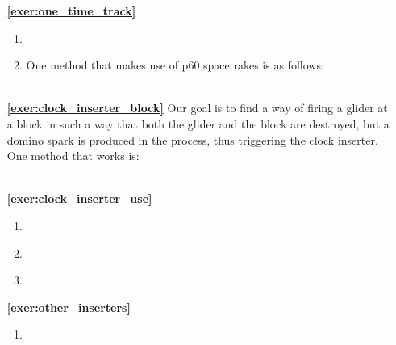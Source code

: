 \begin{multicols}{2}
\begin{itemize}[leftmargin=0em]
	
	\item[\bf\color{ocre}\sffamily\ref{exer:one_time_track}]
	\begin{enumerate}[leftmargin=1.5em,label=\bf\color{ocre}(\alph*)]
		\item {} \\
		
		\item One method that makes use of p$60$ space rakes is as follows:\\[-0.6em]
		
		 \\
	\end{enumerate}


	\item[\bf\color{ocre}\sffamily\ref{exer:clock_inserter_block}] Our goal is to find a way of firing a glider at a block in such a way that both the glider and the block are destroyed, but a domino spark is produced in the process, thus triggering the clock inserter. One method that works is:\\[-0.6em]
	
	 \\
	
	
	\item[\bf\color{ocre}\sffamily\ref{exer:clock_inserter_use}]
	\begin{enumerate}[leftmargin=1.5em,label=\bf\color{ocre}(\alph*)]
		\item {} \\
		
		\item {} \\

		\item {} \\
	\end{enumerate}
	

	\item[\bf\color{ocre}\sffamily\ref{exer:other_inserters}]
	\begin{enumerate}[leftmargin=1.5em,label=\bf\color{ocre}(\alph*)]
		\item {} \\
		

\end{enumerate}
\end{itemize}
\end{multicols}
